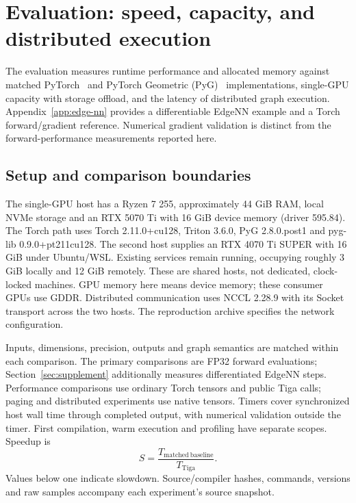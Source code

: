 \section{Evaluation: speed, capacity, and distributed execution}
\label{sec:evaluation}
The evaluation measures runtime performance and allocated memory against matched
PyTorch~\cite{pytorch} and PyTorch Geometric (PyG)~\cite{pyg,pyg2} implementations,
single-GPU capacity with storage offload, and the
latency of distributed graph execution.
Appendix~\ref{app:edge-nn} provides a differentiable EdgeNN example and a
Torch forward/gradient reference. Numerical gradient validation is distinct from
the forward-performance measurements reported here.

\subsection{Setup and comparison boundaries}
\label{sec:experimental-setup}
The single-GPU host has a Ryzen 7 255, approximately 44 GiB RAM, local NVMe
storage and an RTX 5070 Ti with 16 GiB device memory (driver 595.84).
The Torch path uses Torch 2.11.0+cu128, Triton 3.6.0, PyG 2.8.0.post1 and
pyg-lib 0.9.0+pt211cu128. The second host supplies an RTX 4070 Ti SUPER with
16 GiB under Ubuntu/WSL. Existing services remain running, occupying roughly
3 GiB locally and 12 GiB remotely. These are shared hosts, not dedicated,
clock-locked machines. GPU memory here means device memory; these consumer
GPUs use GDDR. Distributed communication uses NCCL 2.28.9 with its Socket
transport across the two hosts. The reproduction archive specifies the network configuration.

Inputs, dimensions, precision, outputs and graph semantics are matched within
each comparison. The primary comparisons are FP32 forward evaluations;
Section~\ref{sec:supplement} additionally measures differentiated EdgeNN steps.
Performance comparisons use ordinary Torch tensors and public Tiga
calls; paging and distributed experiments use native tensors. Timers cover synchronized host wall
time through completed output, with numerical validation outside the timer.
First compilation, warm execution and profiling have separate scopes. Speedup is
$$
 S = \frac{T_{\mathrm{matched\ baseline}}}{T_{\mathrm{Tiga}}}.
$$
Values below one indicate slowdown. Source/compiler hashes, commands, versions
and raw samples accompany each experiment's source snapshot.

